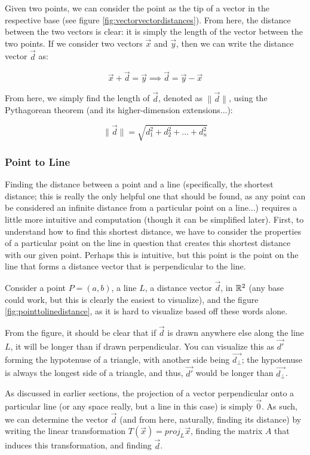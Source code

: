 \documentclass[12pt]{article}
\begin{document}
Given two points, we can consider the point as the tip of a vector in the respective base (see figure \ref{fig:vectorvectordistances}). From here, the distance between the two vectors is clear: it is simply the length of the vector between the two points. If we consider two vectors $\vec{x}$ and $\vec{y}$, then we can write the distance vector $\vec{d}$ as:

$$\vec{x} + \vec{d} = \vec{y} \implies \vec{d} = \vec{y} - \vec{x}$$

From here, we simply find the length of $\vec{d}$, denoted as $\| \vec{d} \| $, using the Pythagorean theorem (and its higher-dimension extensions...):

$$\| \vec{d} \|  = \sqrt{d_1^2 + d_2^2 + ... + d_n^2}$$

\subsubsection{Point to Line}
Finding the distance between a point and a line (specifically, the shortest distance; this is really the only helpful one that should be found, as any point can be considered an infinite distance from a particular point on a line...) requires a little more intuitive and computation (though it can be simplified later). First, to understand how to find this shortest distance, we have to consider the properties of a particular point on the line in question that creates this shortest distance with our given point. Perhaps this is intuitive, but this point is the point on the line that forms a distance vector that is perpendicular to the line. 

Consider a point $P = (a,b)$, a line $L$, a distance vector $\vec{d}$, in $\mathbb{R}^2$ (any base could work, but this is clearly the easiest to visualize), and the figure \ref{fig:pointtolinedistance}, as it is hard to visualize based off these words alone.


From the figure, it should be clear that if $\vec{d}$ is drawn anywhere else along the line $L$, it will be longer than if drawn perpendicular. You can visualize this as $\vec{d'}$ forming the hypotenuse of a triangle, with another side being $\vec{d_{\perp}}$; the hypotenuse is always the longest side of a triangle, and thus, $\vec{d'}$ would be longer than $\vec{d_{\perp}}$. 

As discussed in earlier sections, the projection of a vector perpendicular onto a particular line (or any space really, but a line in this case) is simply $\vec{0}$. As such, we can determine the vector $\vec{d}$ (and from here, naturally, finding its distance) by writing the linear transformation $T(\vec{x}) = proj_{L}\vec{x}$, finding the matrix $A$ that induces this transformation, and finding $\vec{d}$. 
\end{document}
